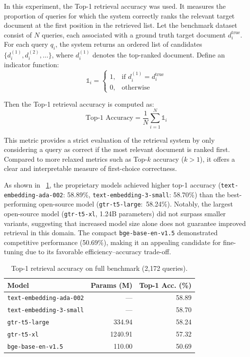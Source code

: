 \documentclass[a4paper,fleqn]{cas-dc}
\begin{document}
In this experiment, the Top-1 retrieval accuracy was used. It measures the proportion of queries for which the system correctly ranks the relevant target document at the first position in the retrieved list. Let the benchmark dataset consist of \(N\) queries, each associated with a ground truth target document \(d_i^\text{true}\). For each query \(q_i\), the system returns an ordered list of candidates \(\{d_i^{(1)}, d_i^{(2)}, \dots\}\), where \(d_i^{(1)}\) denotes the top-ranked document. Define an indicator function:
\begin{equation}
\mathbb{1}_{i} =
\begin{cases}
1, & \text{if } d_i^{(1)} = d_i^\text{true} \\
0, & \text{otherwise}
\end{cases}
\end{equation}

Then the Top-1 retrieval accuracy is computed as:
\begin{equation}
\text{Top-1 Accuracy} =
\frac{1}{N} \sum_{i=1}^{N} \mathbb{1}_{i}
\end{equation}

This metric provides a strict evaluation of the retrieval system by only considering a query as correct if the most relevant document is ranked first. Compared to more relaxed metrics such as Top-$k$ accuracy (\(k>1\)), it offers a clear and interpretable measure of first-choice correctness.


As shown in \tablename~\ref{tab:embedding_model_full}, the proprietary models achieved higher top-1 accuracy (\texttt{text-embedding-ada-002}: 58.89\%, \texttt{text-embedding-3-small}: 58.70\%) than the best-performing open-source model (\texttt{gtr-t5-large}:~58.24\%). Notably, the largest open-source model (\texttt{gtr-t5-xl}, 1.24B parameters) did not surpass smaller variants, suggesting that increased model size alone does not guarantee improved retrieval in this domain. The compact \texttt{bge-base-en-v1.5} demonstrated competitive performance (50.69\%), making it an appealing candidate for fine-tuning due to its favorable efficiency–accuracy trade-off.


\begin{table}
\centering
\caption{Top-1 retrieval accuracy on full benchmark (2,172 queries).}
\label{tab:embedding_model_full}
\begin{tabular}{@{}lrr@{}}
\toprule
\textbf{Model} & \textbf{Params (M)} & \textbf{Top-1 Acc. (\%)} \\
\midrule
\texttt{text-embedding-ada-002} & --- & 58.89 \\
\texttt{text-embedding-3-small} & --- & 58.70 \\
\texttt{gtr-t5-large} & 334.94 & 58.24 \\
\texttt{gtr-t5-xl} & 1240.91 & 57.32 \\
\texttt{bge-base-en-v1.5} & 110.00 & 50.69 \\
\bottomrule
\end{tabular}
\end{table}
\end{document}
